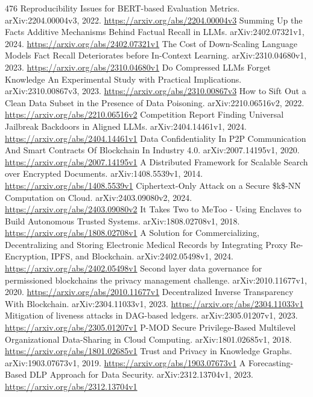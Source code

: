 \documentclass[11pt]{article}
\begin{document}
\begin{thebibliography}{476}
 Reproducibility Issues for BERT-based Evaluation Metrics. arXiv:2204.00004v3, 2022. \url{https://arxiv.org/abs/2204.00004v3}
 Summing Up the Facts Additive Mechanisms Behind Factual Recall in LLMs. arXiv:2402.07321v1, 2024. \url{https://arxiv.org/abs/2402.07321v1}
 The Cost of Down-Scaling Language Models Fact Recall Deteriorates before In-Context Learning. arXiv:2310.04680v1, 2023. \url{https://arxiv.org/abs/2310.04680v1}
 Do Compressed LLMs Forget Knowledge An Experimental Study with Practical Implications. arXiv:2310.00867v3, 2023. \url{https://arxiv.org/abs/2310.00867v3}
 How to Sift Out a Clean Data Subset in the Presence of Data Poisoning. arXiv:2210.06516v2, 2022. \url{https://arxiv.org/abs/2210.06516v2}
 Competition Report Finding Universal Jailbreak Backdoors in Aligned LLMs. arXiv:2404.14461v1, 2024. \url{https://arxiv.org/abs/2404.14461v1}
 Data Confidentiality In P2P Communication And Smart Contracts Of Blockchain In Industry 4.0. arXiv:2007.14195v1, 2020. \url{https://arxiv.org/abs/2007.14195v1}
 A Distributed Framework for Scalable Search over Encrypted Documents. arXiv:1408.5539v1, 2014. \url{https://arxiv.org/abs/1408.5539v1}
 Ciphertext-Only Attack on a Secure \$k\$-NN Computation on Cloud. arXiv:2403.09080v2, 2024. \url{https://arxiv.org/abs/2403.09080v2}
 It Takes Two to MeToo - Using Enclaves to Build Autonomous Trusted Systems. arXiv:1808.02708v1, 2018. \url{https://arxiv.org/abs/1808.02708v1}
 A Solution for Commercializing, Decentralizing and Storing Electronic Medical Records by Integrating Proxy Re-Encryption, IPFS, and Blockchain. arXiv:2402.05498v1, 2024. \url{https://arxiv.org/abs/2402.05498v1}
 Second layer data governance for permissioned blockchains the privacy management challenge. arXiv:2010.11677v1, 2020. \url{https://arxiv.org/abs/2010.11677v1}
 Decentralized Inverse Transparency With Blockchain. arXiv:2304.11033v1, 2023. \url{https://arxiv.org/abs/2304.11033v1}
 Mitigation of liveness attacks in DAG-based ledgers. arXiv:2305.01207v1, 2023. \url{https://arxiv.org/abs/2305.01207v1}
 P-MOD Secure Privilege-Based Multilevel Organizational Data-Sharing in Cloud Computing. arXiv:1801.02685v1, 2018. \url{https://arxiv.org/abs/1801.02685v1}
 Trust and Privacy in Knowledge Graphs. arXiv:1903.07673v1, 2019. \url{https://arxiv.org/abs/1903.07673v1}
 A Forecasting-Based DLP Approach for Data Security. arXiv:2312.13704v1, 2023. \url{https://arxiv.org/abs/2312.13704v1}

\end{thebibliography}
\end{document}
